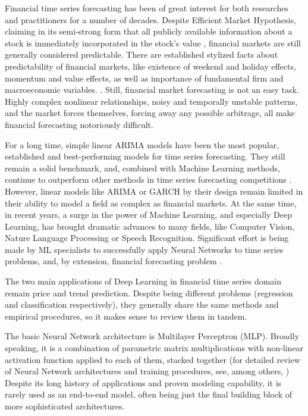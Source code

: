 \documentclass[review, authoryear]{elsarticle}
\begin{document}
\noindent Financial time series forecasting has been of great interest for both researches and practitioners for a number of decades.
Despite Efficient Market Hypothesis, claiming in its semi-strong form that all publicly available information about a stock is immediately incorporated in the stock's value \citep{fama_efficient_1970}, financial markets are still generally considered predictable. There are established stylized facts about predictability of financial markets, like existence of weekend and holiday effects, momentum and value effects, as well as importance of fundamental firm and macroeconomic variables. \citep{schwert_chapter_2003,fama_stock_1981,campbell_stock_1987,rapach_macro_2005}.
Still, financial market forecasting is not an easy task. Highly complex nonlinear relationships, noisy and temporally unstable patterns, and the market forces themselves, forcing away any possible arbitrage, all make financial forecasting notoriously difficult.

For a long time, simple linear ARIMA models have been the most popular, established and best-performing models for time series forecasting. They still remain a solid benchmark, and, combined with Machine Learning methods, continue to outperform other methods in time series forecasting competitions \citep{makridakis_m4_2020}.
However, linear models like ARIMA or GARCH by their design remain limited in their ability to model a field as complex as financial markets.
At the same time, in recent years, a surge in the power of Machine Learning, and especially Deep Learning, has brought dramatic advances to many fields, like Computer Vision, Nature Language Processing or Speech Recognition. Significant effort is being made by ML specialists to successfully apply Neural Networks to time series problems, and, by extension, financial forecasting problem \citep{sezer_financial_2019}.

The two main applications of Deep Learning in financial time series domain remain price and trend prediction. Despite being different problems (regression and classification respectively), they generally share the same methods and empirical procedures, so it makes sense to review them in tandem.

The basic Neural Network architecture is Multilayer Perceptron (MLP).
Broadly speaking, it is a combination of parametric matrix multiplications with non-linear activation function applied to each of them, stacked together (for detailed review of Neural Network architectures and training procedures, see, among others, \cite{sezer_financial_2019})
Despite its long history of applications and proven modeling capability, it is rarely used as an end-to-end model, often being just the final building block of more sophisticated architectures.
\end{document}
